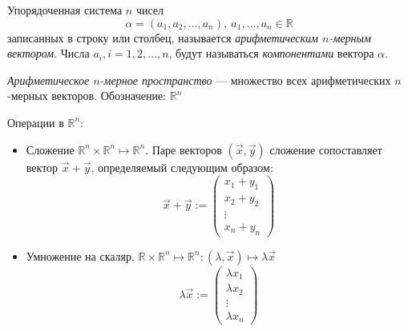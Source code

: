 \documentclass[a4paper, 12pt]{article}
\begin{document}
Упорядоченная система $n$ чисел
\[\alpha = (a_1, a_2, \ldots, a_n),\ a_1, \ldots, a_n \in \mathbb{R}\]
записанных в строку или столбец, называется \textit{арифметическим $n$-мерным вектором}. 
Числа $a_i, i = 1, 2, \ldots, n$, будут называться \textit{компонентами} вектора $\alpha$.

\textit{Арифметическое $n$-мерное пространство} --- множество всех арифметических $n$-мерных векторов. Обозначение: $\mathbb{R}^n$

\vspace{0.5cm}
Операции в $\mathbb{R}^n$:

\begin{itemize}
\item Сложение $\mathbb{R}^n \times \mathbb{R}^n \mapsto \mathbb{R}^n$. Паре векторов $(\vec{x}, \vec{y})$ сложение сопоставляет вектор $\vec{x} + \vec{y}$, определяемый следующим образом:
\[\vec{x} + \vec{y} \mathrel{:=} 
\begin{pmatrix}
x_1 + y_1 \\
x_2 + y_2 \\
\vdots \\
x_n + y_n
\end{pmatrix}\]
\item Умножение на скаляр. $\mathbb{R} \times \mathbb{R}^n \mapsto \mathbb{R}^n : (\lambda, \vec{x}) \mapsto \lambda\vec{x}$
\[\lambda\vec{x} \mathrel{:=} \begin{pmatrix}
\lambda x_1\\
\lambda x_2\\
\vdots\\
\lambda x_n
\end{pmatrix}\]
\end{itemize}
\end{document}
